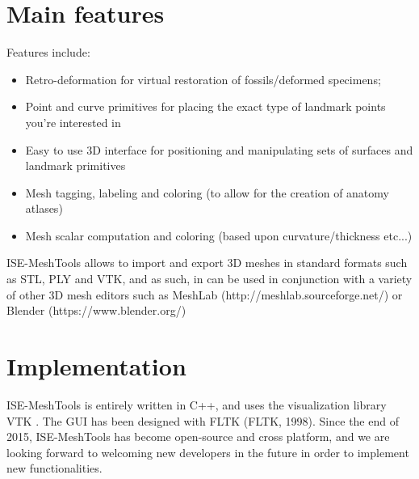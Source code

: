 \documentclass[12pt, a4paper]{book}
\begin{document}
\section*{Main features}
Features include:
\begin{itemize}
\item Retro-deformation for virtual restoration of fossils/deformed specimens;
\item Point and curve primitives for placing the exact type of landmark points you’re interested in
\item Easy to use 3D interface for positioning and manipulating sets of surfaces and landmark primitives
\item Mesh tagging, labeling and coloring (to allow for the creation of anatomy atlases)
\item Mesh scalar computation and coloring (based upon curvature/thickness etc...)
\end{itemize}

 ISE-MeshTools allows to import and export 3D meshes in standard formats such as STL, PLY and VTK, and as such, in can be used in conjunction with a variety of other 3D mesh editors such  as MeshLab (http://meshlab.sourceforge.net/) or Blender (https://www.blender.org/) 
\section*{Implementation}
ISE-MeshTools is entirely written in C++, and uses the visualization library VTK \citep{Avila2001}. The GUI has been designed with FLTK (FLTK, 1998). Since the end of 2015, ISE-MeshTools has become open-source and cross platform, and we are looking forward to welcoming new developers in the future in order to implement new functionalities. 


		 
		 
     
	   
		 
		 
		 
		 
		 
		 
		 
		 
		 
		 

\cleardoublepage
{}

  		
\end{document}

